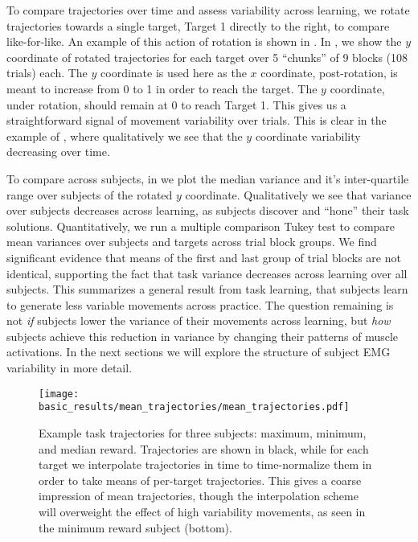 \documentclass[../main.tex]{subfiles}
\begin{document}
To compare trajectories over time and assess variability across learning, we rotate trajectories towards a single target, Target 1 directly to the right, to compare like-for-like. An example of this action of rotation is shown in . In , we show the $y$ coordinate of rotated trajectories for each target over 5 ``chunks'' of 9 blocks (108 trials) each. The $y$ coordinate is used here as the $x$ coordinate, post-rotation, is meant to increase from 0 to 1 in order to reach the target. The $y$ coordinate, under rotation, should remain at 0 to reach Target 1. This gives us a straightforward signal of movement variability over trials. This is clear in the example of , where qualitatively we see that the $y$ coordinate variability decreasing over time.

To compare across subjects, in  we plot the median variance and it's inter-quartile range over subjects of the rotated $y$ coordinate. Qualitatively we see that variance over subjects decreases across learning, as subjects discover and ``hone'' their task solutions. Quantitatively, we run a multiple comparison Tukey test to compare mean variances over subjects and targets across trial block groups. We find significant evidence that means of the first and last group of trial blocks are not identical, supporting the fact that task variance decreases across learning over all subjects. This summarizes a general result from task learning, that subjects learn to generate less variable movements across practice. The question remaining is not \textit{if} subjects lower the variance of their movements across learning, but \textit{how} subjects achieve this reduction in variance by changing their patterns of muscle activations. In the next sections we will explore the structure of subject EMG variability in more detail.


\begin{figure}[!htb]%
    \centering
    \texttt{[image: basic\_results/mean\_trajectories/mean\_trajectories.pdf]}
    \caption[Example task trajectories and means per target]{Example task trajectories for three subjects: maximum, minimum, and median reward. Trajectories are shown in black, while for each target we interpolate trajectories in time to time-normalize them in order to take means of per-target trajectories. This gives a coarse impression of mean trajectories, though the interpolation scheme will overweight the effect of high variability movements, as seen in the minimum reward subject (bottom).}\label{fig:mean_trajectories}
\end{figure}
\end{document}
